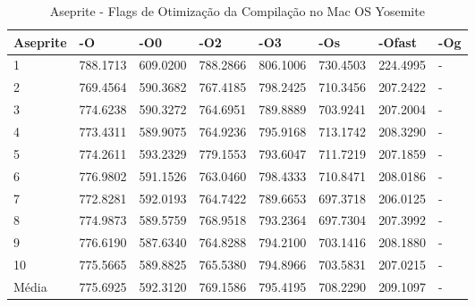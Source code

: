 \begin{table}[!ht]
\centering
\caption{Aseprite - Flags de Otimização da Compilação no Mac OS Yosemite}
\label{tab:otimizacao_compilacao:mac:aseprite}
\begin{tabular}{llllllll}
\textbf{Aseprite} & \textbf{-O}  & \textbf{-O0}   & \textbf{-O2} & \textbf{-O3} & \textbf{-Os} & \textbf{-Ofast} & \textbf{-Og} \\ \toprule
1                 & 788.1713     &  609.0200      &  788.2866    & 806.1006     &  730.4503  &   224.4995        &  -           \\ 
2                 & 769.4564     &  590.3682      &  767.4185    & 798.2425     &  710.3456  &   207.2422        &  -           \\ 
3                 & 774.6238     &  590.3272      &  764.6951    & 789.8889     &  703.9241  &   207.2004        &  -           \\ 
4                 & 773.4311     &  589.9075      &  764.9236    & 795.9168     &  713.1742  &   208.3290        &  -           \\ 
5                 & 774.2611     &  593.2329      &  779.1553    & 793.6047     &  711.7219  &   207.1859        &  -           \\ 
6                 & 776.9802     &  591.1526      &  763.0460    & 798.4333     &  710.8471  &   208.0186        &  -           \\ 
7                 & 772.8281     &  592.0193      &  764.7422    & 789.6653     &  697.3718  &   206.0125        &  -           \\ 
8                 & 774.9873     &  589.5759      &  768.9518    & 793.2364     &  697.7304  &   207.3992        &  -           \\ 
9                 & 776.6190     &  587.6340      &  764.8288    & 794.2100     &  703.1416  &   208.1880        &  -           \\ 
10                & 775.5665     &  589.8825      &  765.5380    & 794.8966     &  703.5831  &   207.0215        &  -           \\ \bottomrule
Média             & 775.6925     &  592.3120      &  769.1586    & 795.4195     &  708.2290  &   209.1097        &  -           \\ 
\end{tabular}
\end{table}

